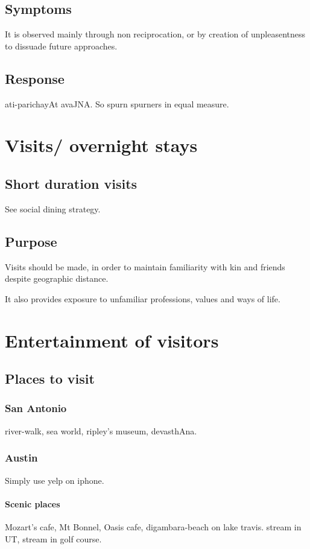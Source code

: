 \documentclass[oneside, article]{memoir}
\begin{document}
\subsection{Symptoms}
It is observed mainly through non reciprocation, or by creation of unpleasentness to dissuade future approaches.

\subsection{Response}
ati-parichayAt avaJNA. So spurn spurners in equal measure.


\section{Visits/ overnight stays}
\subsection{Short duration visits}
See social dining strategy.

\subsection{Purpose}
Visits should be made, in order to maintain familiarity with kin and friends despite geographic distance.

It also provides exposure to unfamiliar professions, values and ways of life.

\section{Entertainment of visitors}
\subsection{Places to visit}
\subsubsection{San Antonio}
river-walk, sea world, ripley's museum, devasthAna.

\subsubsection{Austin}
Simply use yelp on iphone.

\paragraph*{Scenic places}
Mozart's cafe, Mt Bonnel, Oasis cafe, digambara-beach on lake travis. stream in UT, stream in golf course.
\end{document}
